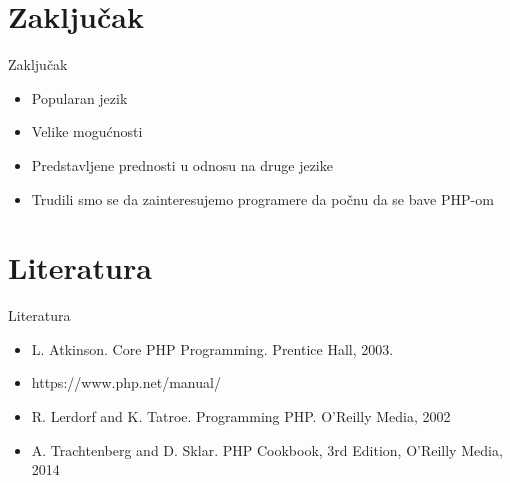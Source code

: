 \documentclass{beamer}
\begin{document}
\section{Zaključak}
\begin{frame}{Zaključak}
    \begin{itemize}
    \item Popularan jezik
    \item Velike mogućnosti 
    \item Predstavljene prednosti u odnosu na druge jezike
    \item Trudili smo se da zainteresujemo programere da počnu da se bave PHP-om
    \end{itemize}
\end{frame}


\section{Literatura}
\begin{frame}{Literatura}
    \begin{itemize}
        \item L. Atkinson. Core PHP Programming. Prentice Hall, 2003.
        \item https://www.php.net/manual/
        \item R. Lerdorf and K. Tatroe. Programming PHP. O'Reilly Media, 2002
        \item A. Trachtenberg and D. Sklar. PHP Cookbook, 3rd Edition,  O'Reilly Media, 2014
    \end{itemize}
\end{frame}
\end{document}
